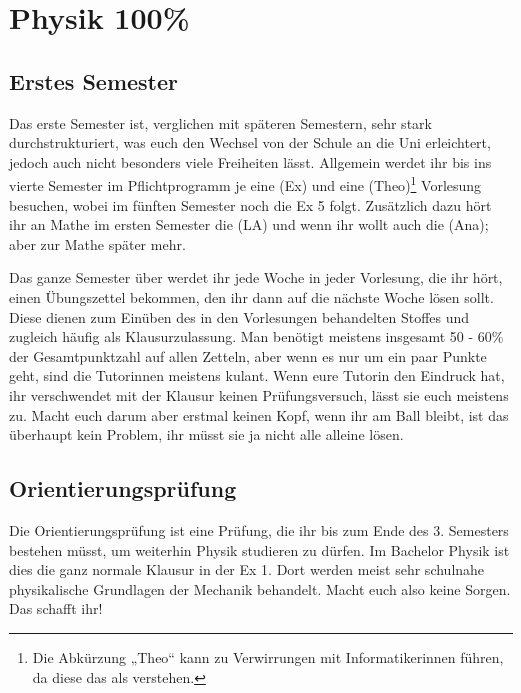 \vspace{-3mm}

\section{Physik 100\%}

\subsection{Erstes Semester}
Das erste Semester ist, verglichen mit späteren Semestern, sehr stark durchstrukturiert, was euch den Wechsel von der Schule an die Uni erleichtert, jedoch auch nicht besonders viele Freiheiten lässt.  Allgemein werdet ihr bis ins vierte Semester im Pflichtprogramm je eine  (\gls{Ex}) und eine  (\gls{Theo})\footnote{Die Abkürzung „Theo“ kann zu Verwirrungen mit Informatikerinnen führen, da diese das als  verstehen.} Vorlesung besuchen, wobei im fünften Semester noch die \gls{Ex} 5 folgt. Zusätzlich dazu hört ihr an Mathe im ersten Semester die  (\gls{LA}) und wenn ihr wollt auch die  (\gls{Ana}); aber zur Mathe später mehr.

Das ganze Semester über werdet ihr jede Woche in jeder Vorlesung, die ihr hört, einen Übungszettel bekommen, den ihr dann auf die nächste Woche lösen sollt. Diese dienen zum Einüben des in den Vorlesungen behandelten Stoffes und zugleich häufig als Klausurzulassung. Man benötigt meistens insgesamt 50 - 60\% der Gesamtpunktzahl auf allen Zetteln, aber wenn es nur um ein paar Punkte geht, sind die Tutorinnen meistens kulant. Wenn eure Tutorin den Eindruck hat, ihr verschwendet mit der Klausur keinen Prüfungsversuch, lässt sie euch meistens zu. Macht euch darum aber erstmal keinen Kopf, wenn ihr am Ball bleibt, ist das überhaupt kein Problem, ihr müsst sie ja nicht alle alleine lösen.

\subsection{Orientierungsprüfung}
Die Orientierungsprüfung ist eine Prüfung, die ihr bis zum Ende des 3. Semesters bestehen müsst, um weiterhin Physik studieren zu dürfen. Im Bachelor Physik ist dies die ganz normale Klausur in der \gls{Ex} 1. Dort werden meist sehr schulnahe physikalische Grundlagen der Mechanik behandelt. Macht euch also keine Sorgen. Das schafft ihr!

